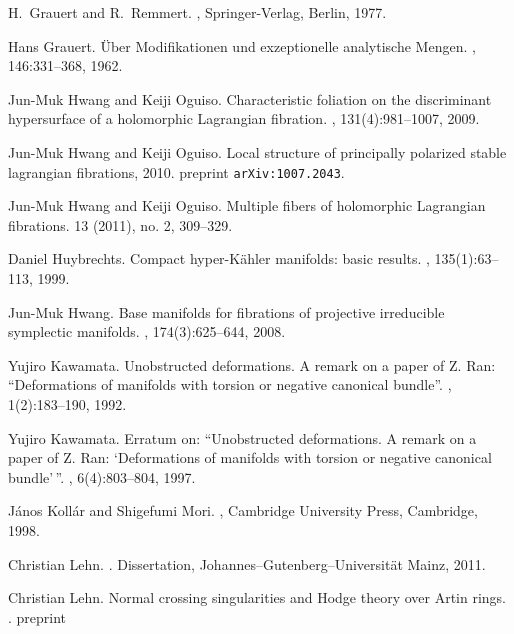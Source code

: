 \documentclass[a4paper,11pt,final]{amsart}
\theoremstyle{plain}
\theoremstyle{definition}
\numberwithin{equation}{section}
\theoremstyle{remark}
\begin{document}
\begin{thebibliography}{BHPVdV04}
H.~Grauert and R.~Remmert.
, 
\newblock Springer-Verlag, Berlin, 1977.

Hans Grauert.
\newblock \"{U}ber {M}odifikationen und exzeptionelle analytische {M}engen.
, 146:331--368, 1962.

Jun-Muk Hwang and Keiji Oguiso.
\newblock Characteristic foliation on the discriminant hypersurface of a
  holomorphic {L}agrangian fibration.
, 131(4):981--1007, 2009.

Jun-Muk Hwang and Keiji Oguiso.
\newblock Local structure of principally polarized stable lagrangian
  fibrations, 2010.
\newblock preprint {\tt arXiv:1007.2043}.

Jun-Muk Hwang and Keiji Oguiso.
\newblock Multiple fibers of holomorphic Lagrangian fibrations.
 13 (2011), no. 2, 309--329.  

Daniel Huybrechts.
\newblock Compact hyper-{K}\"ahler manifolds: basic results.
, 135(1):63--113, 1999.

Jun-Muk Hwang.
\newblock Base manifolds for fibrations of projective irreducible symplectic
  manifolds.
, 174(3):625--644, 2008.

Yujiro Kawamata.
\newblock Unobstructed deformations. {A} remark on a paper of {Z}. {R}an:
  ``{D}eformations of manifolds with torsion or negative canonical bundle''.
, 1(2):183--190, 1992.

Yujiro Kawamata.
\newblock Erratum on: ``{U}nobstructed deformations. {A} remark on a paper of
  {Z}. {R}an: `{D}eformations of manifolds with torsion or negative canonical
  bundle'\,''.
, 6(4):803--804, 1997.

J{\'a}nos Koll{\'a}r and Shigefumi Mori.
,
\newblock Cambridge University Press, Cambridge, 1998.

Christian Lehn.
.
\newblock Dissertation, Johannes--{G}utenberg--{U}niversit\"at Mainz, 2011.

Christian Lehn.
\newblock Normal crossing singularities and Hodge theory over Artin rings.
.
\newblock preprint 


\end{thebibliography}
\end{document}
